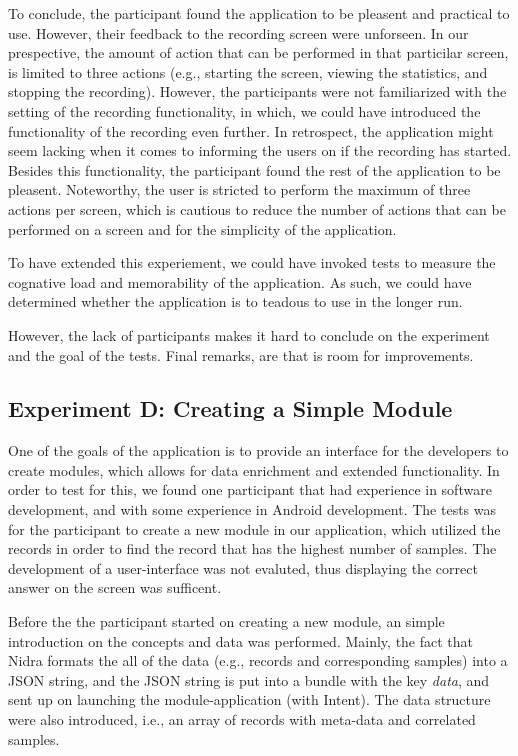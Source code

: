 To conclude, the participant found the application to be pleasent and practical to use. However, their feedback to the recording screen were unforseen. In our prespective, the amount of action that can be performed in that particilar screen, is limited to three actions (e.g., starting the screen, viewing the statistics, and stopping the recording). However, the participants were not familiarized with the setting of the recording functionality, in which, we could have introduced the functionality of the recording even further. In retrospect, the application might seem lacking when it comes to informing the users on if the recording has started. Besides this functionality, the participant found the rest of the application to be pleasent. Noteworthy, the user is stricted to perform the maximum of three actions per screen, which is cautious to reduce the number of actions that can be performed on a screen and for the simplicity of the application. 

To have extended this experiement, we could have invoked tests to measure the cognative load and memorability of the application. As such, we could have determined whether the application is to teadous to use in the longer run. 

However, the lack of participants makes it hard to conclude on the experiment and the goal of the tests. Final remarks, are that is room for improvements.

\subsection{Experiment D: Creating a Simple Module}
One of the goals of the application is to provide an interface for the developers to create modules, which allows for data enrichment and extended functionality. In order to test for this, we found one participant that had experience in software development, and with some experience in Android development. The tests was for the participant to create a new module in our application, which utilized the records in order to find the record that has the highest number of samples. The development of a user-interface was not evaluted, thus displaying the correct answer on the screen was sufficent. 

Before the the participant started on creating a new module, an simple introduction on the concepts and data was performed. Mainly, the fact that Nidra formats the all of the data (e.g., records and corresponding samples) into a JSON string, and the JSON string is put into a bundle with the key \textit{data}, and sent up on launching the module-application (with Intent). The data structure were also introduced, i.e., an array of records with meta-data and correlated samples.

